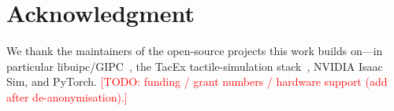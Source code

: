 \documentclass[conference]{IEEEtran}
\newcommand{\todo}[1]{\textcolor{red}{[TODO: #1]}}
\begin{document}
\section*{Acknowledgment}
We thank the maintainers of the open-source projects this work builds on---in
particular libuipc/GIPC~\cite{huang2024gipc}, the TacEx tactile-simulation
stack~\cite{nguyen2024tacex}, NVIDIA Isaac Sim, and PyTorch.
\todo{funding / grant numbers / hardware support (add after de-anonymisation).}



\end{document}
